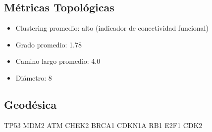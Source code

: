 \documentclass[12pt]{article}
\begin{document}
\subsection*{Métricas Topológicas}
\begin{itemize}
  \item Clustering promedio: alto (indicador de conectividad funcional)
  \item Grado promedio: 1.78
  \item Camino largo promedio: 4.0
  \item Diámetro: 8
\end{itemize}

\subsection*{Geodésica}
TP53 \textrightarrow MDM2 \textrightarrow ATM \textrightarrow CHEK2 \textrightarrow BRCA1 \textrightarrow CDKN1A \textrightarrow RB1 \textrightarrow E2F1 \textrightarrow CDK2
\end{document}
